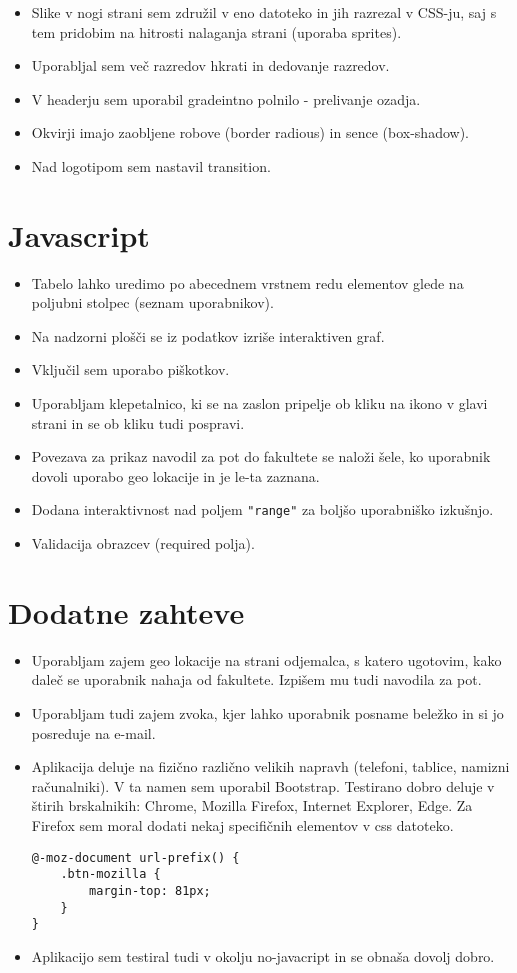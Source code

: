 \documentclass[a4paper,11pt]{article}
\begin{document}
\begin{itemize}
\item Slike v nogi strani sem združil v eno datoteko in jih razrezal v CSS-ju, saj s tem pridobim na hitrosti nalaganja strani (uporaba sprites).
\item Uporabljal sem več razredov hkrati in dedovanje razredov.
\item V headerju sem uporabil gradeintno polnilo - prelivanje ozadja.
\item Okvirji imajo zaobljene robove (border radious) in sence (box-shadow).
\item Nad logotipom sem nastavil transition.
\end{itemize}

\section{Javascript}

\begin{itemize}
\item Tabelo lahko uredimo po abecednem vrstnem redu elementov glede na poljubni stolpec (seznam uporabnikov).
\item Na nadzorni plošči se iz podatkov izriše interaktiven graf.
\item Vključil sem uporabo piškotkov.
\item Uporabljam klepetalnico, ki se na zaslon pripelje ob kliku na ikono v glavi strani in se ob kliku tudi pospravi.
\item Povezava za prikaz navodil za pot do fakultete se naloži šele, ko uporabnik dovoli uporabo geo lokacije in je le-ta zaznana.
\item Dodana interaktivnost nad poljem \texttt{"range"} za boljšo uporabniško izkušnjo.
\item Validacija obrazcev (required polja).
\end{itemize}

\section{Dodatne zahteve}

\begin{itemize}
\item Uporabljam zajem geo lokacije na strani odjemalca, s katero ugotovim, kako daleč se uporabnik nahaja od fakultete. Izpišem mu tudi navodila za pot.
\item Uporabljam tudi zajem zvoka, kjer lahko uporabnik posname beležko in si jo posreduje na e-mail.
\item Aplikacija deluje na fizično različno velikih napravh (telefoni, tablice, namizni računalniki). V ta namen sem uporabil Bootstrap. Testirano dobro deluje v štirih brskalnikih: Chrome, Mozilla Firefox, Internet Explorer, Edge. Za Firefox sem moral dodati nekaj specifičnih elementov v css datoteko.
\begin{lstlisting}
@-moz-document url-prefix() {
    .btn-mozilla {
        margin-top: 81px;
    }
}
\end{lstlisting}
\item Aplikacijo sem testiral tudi v okolju no-javacript in se obnaša dovolj dobro.
\end{itemize}
\end{document}
